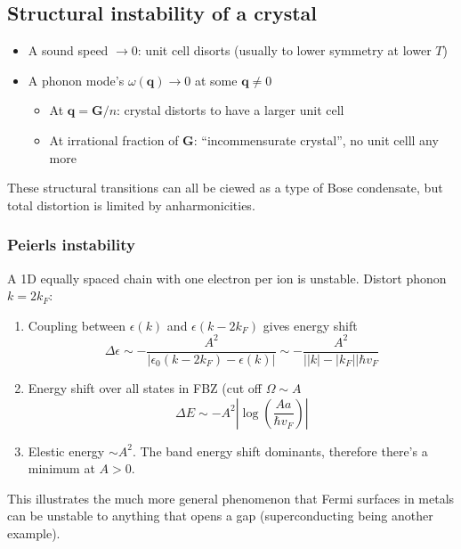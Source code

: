 \documentclass[11pt,letterpaper]{article}
\numberwithin{equation}{section} %
\renewcommand*{\vec}[1]{\bm{#1}}
\begin{document}
\subsection{Structural instability of a crystal}
\label{sub:structural_instability_of_a_crystal}
\begin{itemize}
	\item A sound speed $\to 0$: unit cell disorts (usually to lower symmetry
		at lower $T$) 
	\item A phonon mode's $\omega(\vec q)\to 0$ at some $\vec q \neq 0$
		\begin{itemize}
		  \item At $\vec q = \vec G/n$: crystal distorts to have a larger
			  unit cell
		  \item At irrational fraction of $\vec G$: ``incommensurate
			  crystal'', no unit celll any more
		\end{itemize}
\end{itemize}
These structural transitions can all be ciewed as a type of Bose condensate,
but total distortion is limited by anharmonicities. 

\subsubsection{Peierls instability}
\label{ssub:Peierls instability}
A 1D equally spaced chain with one electron per ion is unstable. Distort
phonon $k = 2k_F$: 
\begin{enumerate}
	\item Coupling between $\epsilon(k)$ and $\epsilon(k-2k_F)$ gives energy
		shift 
		\begin{equation}
			\Delta\epsilon\sim -\frac{A^2}{|\epsilon_0(k-2k_F)-\epsilon(k)|}
			\sim -\frac{A^2}{\big||k|-|k_F|\big|\hbar v_F}
		\end{equation}
	\item Energy shift over all states in FBZ (cut off $\Omega\sim A$ 
		\begin{equation}
			\Delta E\sim -A^2 \left| \log \left( \frac{Aa}{\hbar v_F} \right) \right|
		\end{equation}
	\item Elestic energy $\sim A^2$. The band energy shift dominants,
		therefore there's a minimum at $A>0$. 
\end{enumerate}
This illustrates the much more general phenomenon that Fermi surfaces in
metals can be unstable to anything that opens a gap (superconducting being
another example). 
\end{document}

